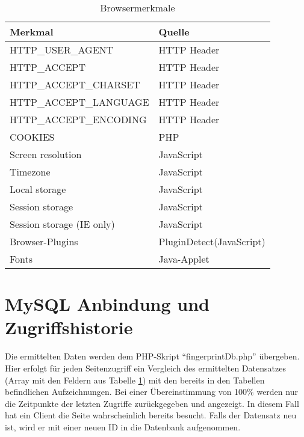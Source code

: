 \documentclass[12pt,a4paper,titlepage]{article}
\begin{document}
\begin{table}
\centering
 \begin{tabular}{|l|l|}
 \hline
 Merkmal & Quelle \\
 \hline
 HTTP\_USER\_AGENT & HTTP Header \\
 HTTP\_ACCEPT & HTTP Header \\
 HTTP\_ACCEPT\_CHARSET & HTTP Header \\
 HTTP\_ACCEPT\_LANGUAGE & HTTP Header \\
 HTTP\_ACCEPT\_ENCODING & HTTP Header \\
 \hline
 COOKIES & PHP \\
 \hline
 Screen resolution & JavaScript \\
 Timezone & JavaScript \\
 Local storage & JavaScript \\
 Session storage & JavaScript \\
 Session storage (IE only) & JavaScript \\
 Browser-Plugins & PluginDetect(JavaScript) \\
 \hline
 Fonts & Java-Applet \\
 \hline
  
 \end{tabular} 
\caption{Browsermerkmale}
\label{table-fp} 
\end{table}

\section{MySQL Anbindung und Zugriffshistorie}

Die ermittelten Daten werden dem PHP-Skript "`fingerprintDb.php"' übergeben. Hier erfolgt für jeden Seitenzugriff ein Vergleich des ermittelten Datensatzes (Array mit den Feldern aus Tabelle \ref{table-fp}) mit den bereits in den Tabellen befindlichen Aufzeichnungen. Bei einer Übereinstimmung von 100\% werden nur die Zeitpunkte der letzten Zugriffe zurückgegeben und angezeigt. In diesem Fall hat ein Client die Seite wahrscheinlich bereits besucht. Falls der Datensatz neu ist, wird er mit einer neuen ID in die Datenbank aufgenommen.
\end{document}

